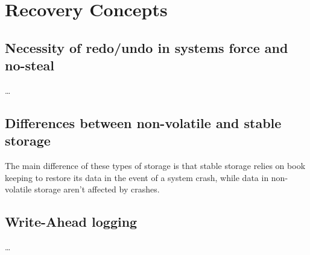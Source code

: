 
\section{Recovery Concepts}

\subsection{Necessity of redo/undo in systems force and no-steal}
\dots

\subsection{Differences between non-volatile and stable storage}
The main difference of these types of storage is that stable storage relies on
book keeping to restore its data in the event of a system crash, while data in
non-volatile storage aren't affected by crashes.

\subsection{Write-Ahead logging}
\dots
